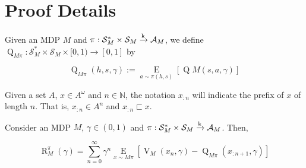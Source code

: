 \documentclass[anon,12pt]{colt2018} %
\newcommand{\AP}[1]{\left(#1\right)}
\newcommand{\AB}[1]{\left[#1\right]}
\newcommand{\Ea}[2]{\underset{#1}{\operatorname{E}}\AB{#2}}
\newcommand{\Nats}{\mathbb{N}}
\newcommand{\K}{\xrightarrow{\textnormal{k}}}
\newcommand{\A}{\mathcal{A}}
\newcommand{\St}{\mathcal{S}}
\newcommand{\V}{\operatorname{V}}
\newcommand{\Q}{\operatorname{Q}}
\newcommand{\Rg}{\operatorname{R}}
\begin{document}
\section{Proof Details}

\begin{samepage}
\begin{definition}

Given an MDP $M$ and $\pi: \St_M^* \times \St_M \K \A_M$, we define $\Q_{M\pi}: \St_M^* \times \St_M \times [0,1) \rightarrow [0,1]$ by

\begin{equation}
\Q_{M\pi}(h,s,\gamma):=\Ea{a\sim\pi(h,s)}{\Q M(s,a,\gamma)}
\end{equation}

\end{definition}
\end{samepage}

Given a set $A$, $x\in A^\omega$ and $n\in\Nats$, the notation $x_{:n}$ will indicate the prefix of $x$ of length $n$. That is, $x_{:n} \in A^n$ and $x_{:n} \sqsubset x$.

\begin{samepage}
\begin{proposition}
\label{prp:regret_vq}

Consider an MDP $M$, $\gamma\in(0,1)$ and $\pi: \St_M^* \times \St_M \K \A_{M}$. Then,

\begin{equation}
\Rg_{M}^{\pi}(\gamma)=\sum_{n=0}^\infty {\gamma^n \Ea{x\sim M\pi}{\V_{M}\AP{x_n,\gamma}-\Q_{M\pi}\AP{x_{:n+1},\gamma}}}
\end{equation}

\end{proposition}
\end{samepage}
\end{document}
